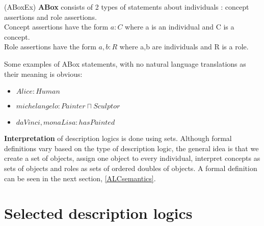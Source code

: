 \begin{mydef} (ABoxEx)
\textbf{ABox} consists of 2 types of statements about individuals : concept assertions and role assertions. \\
Concept assertions have the form $a : C$ where a is an individual and C is a concept. \\
Role assertions have the form $a,b:R$ where a,b are individuals and R is a role.   
\end{mydef}
\begin{myex} 
\label{ABox}
Some examples of ABox statements, with no natural language translations as their meaning is obvious: 
\begin{itemize}
\item $Alice : Human$ 
\item $michelangelo : Painter \sqcap Sculptor$ 
\item $daVinci , monaLisa : hasPainted$
\end{itemize}
\end{myex}

\textbf{Interpretation} of description logics is done using sets. Although formal definitions vary based on the type of description logic, the general idea is that we create a set of objects, assign one object to every individual, interpret concepts as sets of objects and roles as sets of ordered doubles of objects. A formal definition can be seen in the next section, \ref{ALCsemantics}. 
\section{Selected description logics}

